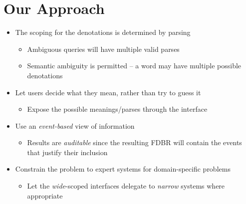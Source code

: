 \documentclass[logoontitle,tabu,supertabular,aspectratio=43]{preney-uwindsor-beamer}
\begin{document}
	\section{Our Approach}
	\begin{frame}{\insertsection}
		\begin{itemize}
			\item The scoping for the denotations is determined by parsing
			\begin{itemize}
				\item Ambiguous queries will have multiple valid parses
				\item Semantic ambiguity is permitted -- a word may have multiple possible denotations
			\end{itemize}
			\item Let users decide what they mean, rather than try to guess it
			\begin{itemize}
				\item Expose the possible meanings/parses through the interface
			\end{itemize}
			\item Use an {\em event-based} view of information \cite{frost:eswcposter2014}
			\begin{itemize}
				\item Results are {\em auditable} since the resulting FDBR will contain the events that justify their inclusion
			\end{itemize}
			\item Constrain the problem to expert systems for domain-specific problems
			\begin{itemize}
				\item Let the {\em wide}-scoped interfaces delegate to {\em narrow} systems where appropriate
			\end{itemize}
		\end{itemize}
	\end{frame}
\end{document}
